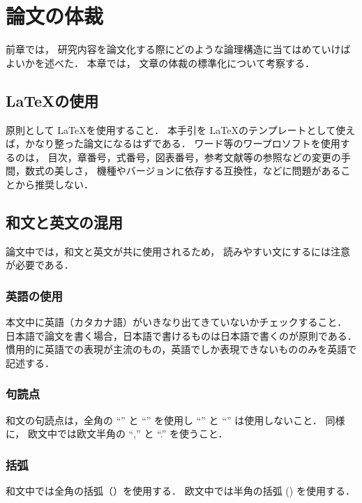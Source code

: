 \chapter{%
論文の体裁}

前章では，
研究内容を論文化する際にどのような論理構造に当てはめていけばよいかを述べた．
本章では，
文章の体裁の標準化について考察する．


\section{\LaTeX の使用}

原則として \LaTeX を使用すること．
本手引を \LaTeX のテンプレートとして使えば，かなり整った論文になるはずである．
ワード等のワープロソフトを使用するのは，
目次，章番号，式番号，図表番号，参考文献等の参照などの変更の手間，数式の美しさ，
機種やバージョンに依存する互換性，などに問題があることから推奨しない．


\section{和文と英文の混用}

論文中では，和文と英文が共に使用されるため，
読みやすい文にするには注意が必要である．


\subsection{英語の使用}

本文中に英語（カタカナ語）がいきなり出てきていないかチェックすること．
日本語で論文を書く場合，日本語で書けるものは日本語で書くのが原則である．
慣用的に英語での表現が主流のもの，英語でしか表現できないもののみを英語で記述する．


\subsection{句読点}

和文の句読点は，全角の ``'' と ``''
を使用し ``'' と ``'' は使用しないこと．
同様に，
欧文中では欧文半角の ``,'' と ``.'' を使うこと．


\subsection{括弧}

和文中では全角の括弧（）を使用する．
欧文中では半角の括弧 () を使用する．


